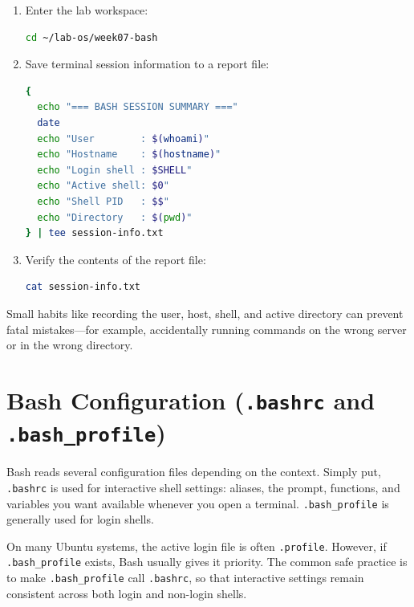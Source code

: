\begin{enumerate}
  \item Enter the lab workspace:
\begin{lstlisting}[language=bash, caption={Entering the lab workspace}]
cd ~/lab-os/week07-bash
\end{lstlisting}

  \item Save terminal session information to a report file:
\begin{lstlisting}[language=bash, caption={Creating a terminal session summary}]
{
  echo "=== BASH SESSION SUMMARY ==="
  date
  echo "User        : $(whoami)"
  echo "Hostname    : $(hostname)"
  echo "Login shell : $SHELL"
  echo "Active shell: $0"
  echo "Shell PID   : $$"
  echo "Directory   : $(pwd)"
} | tee session-info.txt
\end{lstlisting}

  \item Verify the contents of the report file:
\begin{lstlisting}[language=bash, caption={Reading the session summary}]
cat session-info.txt
\end{lstlisting}
\end{enumerate}

\begin{notebox}
Small habits like recording the user, host, shell, and active directory can
prevent fatal mistakes---for example, accidentally running commands on the
wrong server or in the wrong directory.
\end{notebox}

\section{Bash Configuration (\texttt{.bashrc} and \texttt{.bash\_profile})}
\label{sec:bash-configuration}

Bash reads several configuration files depending on the context. Simply put,
\texttt{.bashrc} is used for interactive shell settings: aliases, the prompt,
functions, and variables you want available whenever you open a terminal.
\texttt{.bash\_profile} is generally used for login shells.

On many Ubuntu systems, the active login file is often \texttt{.profile}.
However, if \texttt{.bash\_profile} exists, Bash usually gives it priority.
The common safe practice is to make \texttt{.bash\_profile} call
\texttt{.bashrc}, so that interactive settings remain consistent across both
login and non-login shells.

